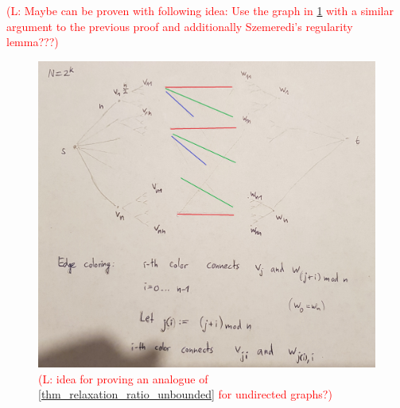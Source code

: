 \documentclass[runningheads]{llncs}
\numberwithin{equation}{section}
\newcommand{\comment}[1]{\textcolor{red}{(L: #1)}}
\begin{document}
\comment{Maybe can be proven with following idea: Use the graph in \cref{fig_undirected_relaxation_ratio} with a similar argument to the previous proof and additionally Szemeredi's regularity lemma???}
\begin{figure}[htpb]
\centering
\includegraphics[width=\textwidth]{img/idea_undirected_approximation_ratio.jpg}
\caption{\comment{idea for proving an analogue of \cref{thm_relaxation_ratio_unbounded} for undirected graphs?}}
\label{fig_undirected_relaxation_ratio}
\end{figure}
\end{document}

